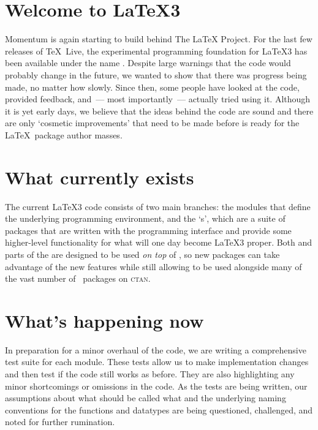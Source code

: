 \documentclass{ltnews}
\begin{document}
\maketitle

\section{Welcome to \LaTeX3}

Momentum is again starting to build behind The LaTeX{} Project. For the
last few releases of \TeX~Live, the experimental programming foundation for
\LaTeX3 has been available under the name . Despite large
warnings that the code would probably change in the future, we wanted to show
that there was progress being made, no matter how slowly. Since then, some
people have looked at the code, provided feedback, and~--- most
importantly~--- actually tried using it. Although it is yet early days, we
believe that the ideas behind the code are sound and there are only `cosmetic
improvements' that need to be made before  is ready for the
\LaTeX~package author masses.

\section{What currently exists}

The current \LaTeX3 code consists of two main branches: the
 modules that define the underlying programming environment,
and the `s', which are a suite of packages that are written
with the  programming interface and provide some higher-level
functionality for what will one day become \LaTeX3 proper. Both  and
parts of the  are designed to be used \emph{on top} of
\LaTeXe, so new packages can take advantage of the new features while still
allowing to be used alongside many of the vast number of \LaTeXe\ packages on
\textsc{ctan}.

\section{What's happening now}

In preparation for a minor overhaul of the  code, we are
writing a comprehensive test suite for each module. These tests allow us to
make implementation changes and then test if the code still works as before.
They are also highlighting any minor shortcomings or omissions in the code.
As the tests are being written, our assumptions about what should be called
what and the underlying naming conventions for the functions and datatypes are
being questioned, challenged, and noted for further rumination.
\end{document}
